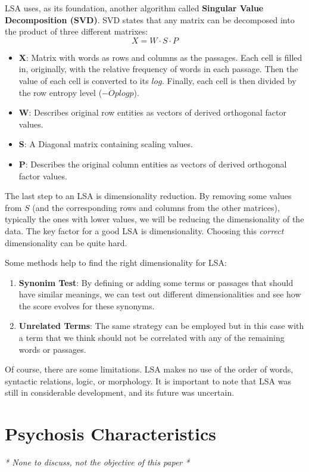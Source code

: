 \documentclass{Paper_Summary}
\begin{document}
    LSA uses, as its foundation, another algorithm called \textbf{Singular Value Decomposition (SVD)}. SVD states that any matrix can be decomposed into the product of three different matrixes: 
    \[ X = W \cdot S \cdot P \]
    \begin{itemize}
        \item \textbf{X}: Matrix with words as rows and columns as the passages. Each cell is filled in, originally, with the relative frequency of words in each passage. Then the value of each cell is converted to its \(log\). Finally, each cell is then divided by the row entropy level (\( -\ddot{O} p log p \)).
        \item \textbf{W}: Describes original row entities as vectors of derived orthogonal factor values.
        \item \textbf{S}: A Diagonal matrix containing scaling values.
        \item \textbf{P}: Describes the original column entities as vectors of derived orthogonal factor values.
    \end{itemize}
    The last step to an LSA is dimensionality reduction. By removing some values from \(S\) (and the corresponding rows and columns from the other matrices), typically the ones with lower values, we will be reducing the dimensionality of the data. The key factor for a good LSA is dimensionality. Choosing this \emph{correct} dimensionality can be quite hard.
    
    Some methods help to find the right dimensionality for LSA:
    \begin{enumerate}
        \item \textbf{Synonim Test}: By defining or adding some terms or passages that should have similar meanings, we can test out different dimensionalities and see how the score evolves for these synonyms.
        \item \textbf{Unrelated Terms}: The same strategy can be employed but in this case with a term that we think should not be correlated with any of the remaining words or passages.
    \end{enumerate}
    
    Of course, there are some limitations. LSA makes no use of the order of words, syntactic relations, logic, or morphology. It is important to note that LSA was still in considerable development, and its future was uncertain.

\breakline

\newpage

\section{Psychosis Characteristics}
\emph{* None to discuss, not the objective of this paper *}
\end{document}
